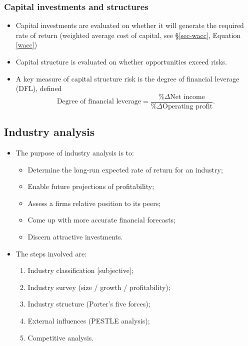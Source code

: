 \documentclass[../notes_compiled.tex]{subfiles}
\begin{document}
\subsubsection{Capital investments and structures}
\begin{itemize}
\item Capital investments are evaluated on whether it will generate the required rate of return (weighted average cost of capital, see \S\ref{sec-wacc}, Equation \ref{wacc})
\item Capital structure is evaluated on whether opportunities exceed risks.
\item A key measure of capital structure risk is the degree of financial leverage (DFL), defined
\begin{equation}
\text{Degree of financial leverage}  =\frac{\%\Delta\text{Net income}}{\%\Delta\text{Operating profit}}.
\end{equation}
\end{itemize}

\subsection{Industry analysis}
\begin{itemize}
\item The purpose of industry analysis is to:
\begin{itemize}
\item Determine the long-run expected rate of return for an industry;
\item Enable future projections of profitability;
\item Assess a firms relative position to its peers;
\item Come up with more accurate financial forecasts;
\item Discern attractive investments.
\end{itemize}
\item The steps involved are:
\begin{enumerate}
\item Industry classification [subjective];
\item Industry survey (size / growth / profitability);
\item Industry structure (Porter’s five forces);
\item External influences (PESTLE analysis);
\item Competitive analysis.
\end{enumerate}
\end{itemize}
\end{document}
